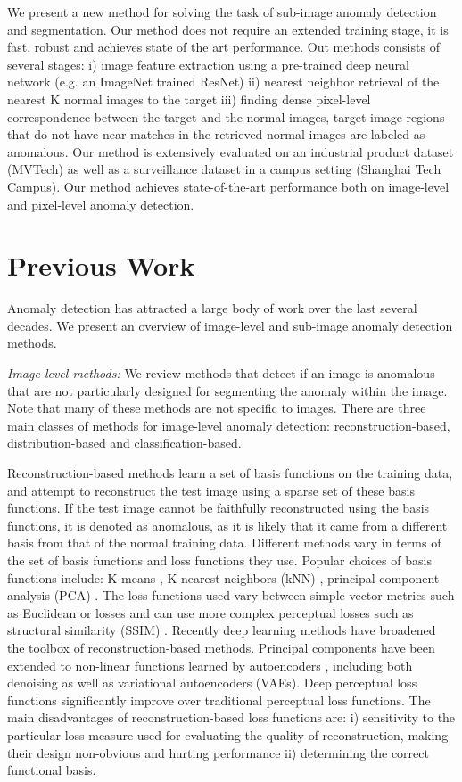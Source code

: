 \documentclass[runningheads]{llncs}
\begin{document}
We present a new method for solving the task of sub-image anomaly detection and segmentation. Our method does not require an extended training stage, it is fast, robust and achieves state of the art performance. Out methods consists of several stages: i) image feature extraction using a pre-trained deep neural network (e.g. an ImageNet trained ResNet) ii) nearest neighbor retrieval of the nearest K normal images to the target iii) finding dense pixel-level correspondence between the target and the normal images, target image regions that do not have near matches in the retrieved normal images are labeled as anomalous. Our method is extensively evaluated on an industrial product dataset (MVTech) as well as a surveillance dataset in a campus setting (Shanghai Tech Campus). Our method achieves state-of-the-art performance both on image-level and pixel-level anomaly detection.   

\section{Previous Work}
\label{sec:prev}

Anomaly detection has attracted a large body of work over the last several decades. We present an overview of image-level and sub-image anomaly detection methods.

\textit{Image-level methods:} We review methods that detect if an image is anomalous that are not particularly designed for segmenting the anomaly within the image. Note that many of these methods are not specific to images. There are three main classes of methods for image-level anomaly detection: reconstruction-based, distribution-based and classification-based. 

Reconstruction-based methods learn a set of basis functions on the training data, and attempt to reconstruct the test image using a sparse set of these basis functions. If the test image cannot be faithfully reconstructed using the basis functions, it is denoted as anomalous, as it is likely that it came from a different basis from that of the normal training data. Different methods vary in terms of the set of basis functions and loss functions they use. Popular choices of basis functions include: K-means \cite{hartigan1979algorithm}, K nearest neighbors (kNN) \cite{eskin2002geometric}, principal component analysis (PCA) \cite{jolliffe2011principal}. The loss functions used vary between simple vector metrics such as Euclidean or  losses and can use more complex perceptual losses such as structural similarity (SSIM) \cite{wang2004image}. Recently deep learning methods have broadened the toolbox of reconstruction-based methods. Principal components have been extended to non-linear functions learned by autoencoders \cite{sakurada2014anomaly}, including both denoising as well as variational autoencoders (VAEs). Deep perceptual loss functions \cite{zhang2016colorful} significantly improve over traditional perceptual loss functions. The main disadvantages of reconstruction-based loss functions are: i) sensitivity to the particular loss measure used for evaluating the quality of reconstruction, making their design non-obvious and hurting performance ii) determining the correct functional basis. 
\end{document}
